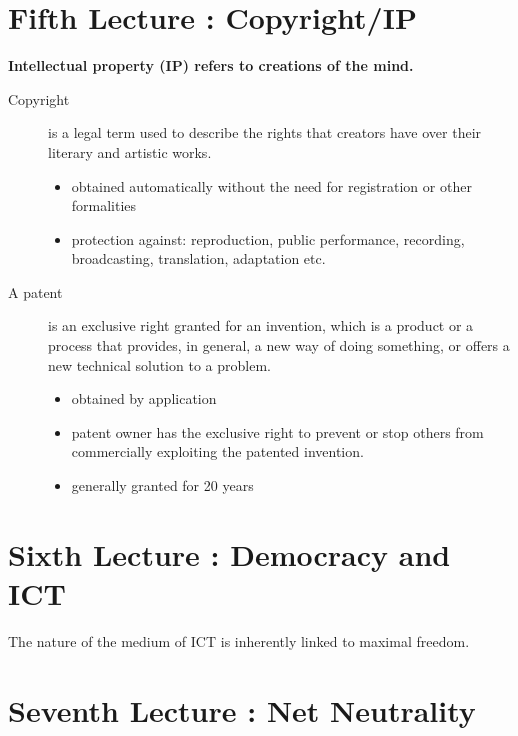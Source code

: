 \documentclass[a4paper]{article}
\begin{document}
\section{Fifth Lecture : Copyright/IP}

\textbf{Intellectual property (IP) refers to creations of the mind.}

\begin{description}
\item[Copyright] is a legal term used to describe the rights that creators have over their literary and artistic works. 
\begin{itemize}
\item obtained automatically without the need for registration or other formalities
\item protection against: reproduction, public performance, recording, broadcasting, translation, adaptation etc.
\end{itemize}

\item[A patent] is an exclusive right granted for an invention, which is a product or a process that provides, in general, a new way of doing something, or offers a new technical solution to a problem.
\begin{itemize}
\item obtained by application
\item patent owner has the exclusive right to prevent or stop others from commercially exploiting the patented invention.
\item generally granted for 20 years
\end{itemize}
\end{description}

\section{Sixth Lecture : Democracy and ICT}

The nature of the medium of ICT is inherently linked to maximal freedom.

\section{Seventh Lecture : Net Neutrality}


\end{document}
